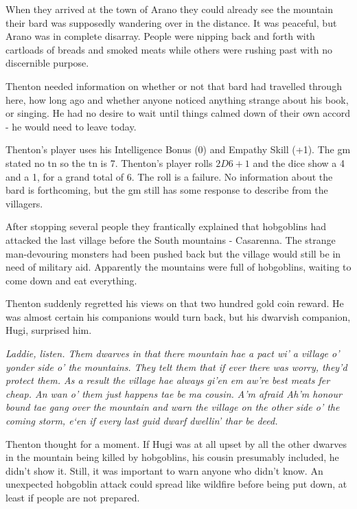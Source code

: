 \begin{multicols}{2}
{\begin{exampletext}

When they arrived at the town of Arano they could already see the mountain their bard was supposedly wandering over in the distance. It was peaceful, but Arano was in complete disarray. People were nipping back and forth with cartloads of breads and smoked meats while others were rushing past with no discernible purpose.

Thenton needed information on whether or not that bard had travelled through here, how long ago and whether anyone noticed anything strange about his book, or singing. He had no desire to wait until things calmed down of their own accord - he would need to leave today.

Thenton's player uses his Intelligence Bonus (0) and Empathy Skill (+1).
The \gls{gm} stated no \gls{tn} so the \gls{tn} is 7.
Thenton's player rolls $2D6+1$ and the dice show a 4 and a 1, for a grand total of 6.
The roll is a failure.
No information about the bard is forthcoming, but the \gls{gm} still has some response to describe from the villagers.

After stopping several people they frantically explained that hobgoblins had attacked the last village before the South mountains - Casarenna.
The strange man-devouring monsters had been pushed back but the village would still be in need of military aid.
Apparently the mountains were full of hobgoblins, waiting to come down and eat everything.

Thenton suddenly regretted his views on that two hundred gold coin reward. He was almost certain his companions would turn back, but his dwarvish companion, Hugi, surprised him.

	\emph{Laddie, listen. Them dwarves in that there mountain hae a pact wi' a village o' yonder side o' the mountains. They telt them that if ever there was worry, they'd protect them. As a result the village hae always gi'en em aw're best meats fer cheap. An wan o' them just happens tae be ma cousin. A'm afraid Ah'm honour bound tae gang over the mountain and warn the village on the other side o' the coming storm, e`en if every last guid dwarf dwellin' thar be deed.}

Thenton thought for a moment. If Hugi was at all upset by all the other dwarves in the mountain being killed by hobgoblins, his cousin presumably included, he didn't show it.
Still, it was important to warn anyone who didn't know.
An unexpected hobgoblin attack could spread like wildfire before being put down, at least if people are not prepared.


\end{exampletext}}
\end{multicols}
